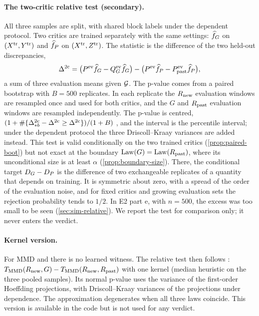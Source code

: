 \paragraph{The two-critic relative test (secondary).}
All three samples are split, with shared block labels under the dependent protocol. Two critics
are trained separately with the same settings: $\widehat{f}_G$ on $(X^{\mathrm{tr}},Y^{\mathrm{tr}})$ and $\widehat{f}_P$
on $(X^{\mathrm{tr}},Z^{\mathrm{tr}})$. The statistic is the difference of the two held-out discrepancies,
\begin{equation}\label{eq:two-critic-stat}
  \Delta^{\mathrm{2c}}=\big(P^{\mathrm{ev}}\widehat{f}_G-Q_{G}^{\mathrm{ev}}\widehat{f}_G\big)-\big(P^{\mathrm{ev}}\widehat{f}_P-P_{\mathrm{past}}^{\mathrm{ev}}\widehat{f}_P\big),
\end{equation}
a sum of three evaluation means given $\mathcal{G}$. The p-value comes from a paired bootstrap with
$B=500$ replicates. In each replicate the $R_{\mathrm{new}}$ evaluation windows are resampled once and used
for both critics, and the $G$ and $R_{\mathrm{past}}$ evaluation windows are resampled independently. The
p-value is centred, $(1+\#\{\Delta^{\mathrm{2c}}_{*b}-\Delta^{\mathrm{2c}}\ge\Delta^{\mathrm{2c}}\})/(1+B)$ \citep{hall1991two}, and the
interval is the percentile interval; under the dependent protocol the three Driscoll--Kraay
variances are added instead. This test is valid conditionally on the two trained critics
(\cref{prop:paired-boot}) but not exact at the boundary $\operatorname{Law}(G)=\operatorname{Law}(R_{\mathrm{past}})$, where its
unconditional size is at least $\alpha$ (\cref{prop:boundary-size}). There, the conditional target $D_G-D_P$ is the difference
of two exchangeable replicates of a quantity that depends on training. It is symmetric about
zero, with a spread of the order of the evaluation noise, and for fixed critics and growing
evaluation sets the rejection probability tends to $1/2$. In E2 part e, with $n=500$, the excess
was too small to be seen (\cref{sec:sim-relative}). We report the test for comparison only; it
never enters the verdict.

\paragraph{Kernel version.}
For MMD and \SigMMD{} there is no learned witness. The relative test then follows
\citet{bounliphone2016test}: $T_{\mathrm{MMD}}(R_{\mathrm{new}},G)-T_{\mathrm{MMD}}(R_{\mathrm{new}},R_{\mathrm{past}})$ with one kernel (median
heuristic on the three pooled samples). Its normal p-value uses the variance of the first-order
Hoeffding projections, with Driscoll--Kraay variances of the projections under dependence. The
approximation degenerates when all three laws coincide. This version is available in the code
but is not used for any verdict.

